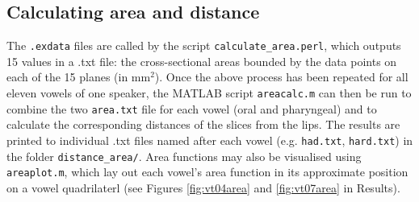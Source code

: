 \subsection{Calculating area and distance}

The \verb|.exdata| files are called by the script \verb|calculate_area.perl|, which outputs 15 values in a .txt file: the cross-sectional areas bounded by the data points on each of the 15 planes (in mm$^2$). Once the above process has been repeated for all eleven vowels of one speaker, the MATLAB script \verb|areacalc.m| can then be run to combine the two \verb|area.txt| file for each vowel (oral and pharyngeal) and to calculate the corresponding distances of the slices from the lips. The results are printed to individual .txt files named after each vowel (e.g. \verb|had.txt|, \verb|hard.txt|) in the folder \verb|distance_area/|. Area functions may also be visualised using \verb|areaplot.m|, which lay out each vowel's area function in its approximate position on a vowel quadrilaterl (see Figures \ref{fig:vt04area} and \ref{fig:vt07area} in Results). 
